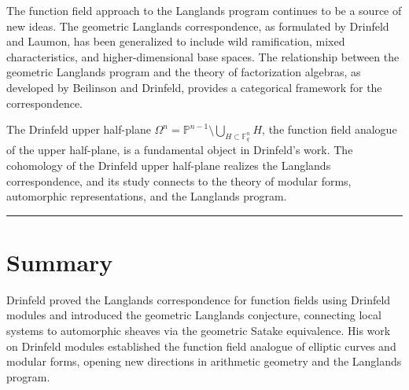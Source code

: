 The function field approach to the Langlands program continues to be a source of new ideas. The geometric Langlands correspondence, as formulated by Drinfeld and Laumon, has been generalized to include wild ramification, mixed characteristics, and higher-dimensional base spaces. The relationship between the geometric Langlands program and the theory of factorization algebras, as developed by Beilinson and Drinfeld, provides a categorical framework for the correspondence.

The Drinfeld upper half-plane $\Omega^n = \mathbb{P}^{n-1} \setminus \bigcup_{H \subset \mathbb{F}_q^n} H$, the function field analogue of the upper half-plane, is a fundamental object in Drinfeld's work. The cohomology of the Drinfeld upper half-plane realizes the Langlands correspondence, and its study connects to the theory of modular forms, automorphic representations, and the Langlands program.

\begin{center}\rule{0.5\linewidth}{0.5pt}\end{center}

\section*{Summary}

Drinfeld proved the Langlands correspondence for function fields using Drinfeld modules and introduced the geometric Langlands conjecture, connecting local systems to automorphic sheaves via the geometric Satake equivalence. His work on Drinfeld modules established the function field analogue of elliptic curves and modular forms, opening new directions in arithmetic geometry and the Langlands program.
